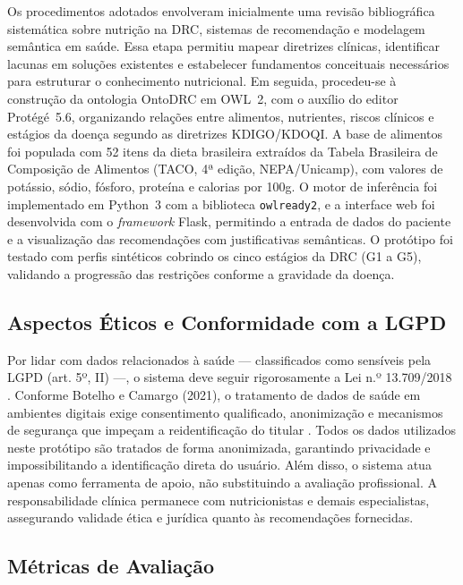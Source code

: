\documentclass[12pt, a4paper, twocolumn]{article}
\begin{document}
Os procedimentos adotados envolveram inicialmente uma revisão bibliográfica sistemática sobre nutrição na DRC, sistemas de recomendação e modelagem semântica em saúde. Essa etapa permitiu mapear diretrizes clínicas, identificar lacunas em soluções existentes e estabelecer fundamentos conceituais necessários para estruturar o conhecimento nutricional. Em seguida, procedeu-se à construção da ontologia OntoDRC em OWL~2, com o auxílio do editor Protégé~5.6, organizando relações entre alimentos, nutrientes, riscos clínicos e estágios da doença segundo as diretrizes KDIGO/KDOQI. A base de alimentos foi populada com 52 itens da dieta brasileira extraídos da Tabela Brasileira de Composição de Alimentos (TACO, 4ª edição, NEPA/Unicamp), com valores de potássio, sódio, fósforo, proteína e calorias por 100g. O motor de inferência foi implementado em Python~3 com a biblioteca \texttt{owlready2}, e a interface web foi desenvolvida com o \textit{framework} Flask, permitindo a entrada de dados do paciente e a visualização das recomendações com justificativas semânticas. O protótipo foi testado com perfis sintéticos cobrindo os cinco estágios da DRC (G1 a G5), validando a progressão das restrições conforme a gravidade da doença.

    \subsection{Aspectos Éticos e Conformidade com a LGPD}

Por lidar com dados relacionados à saúde --- classificados como sensíveis pela LGPD (art. 5º, II) ---, o sistema deve seguir rigorosamente a Lei n.º 13.709/2018 \cite{brasil2018}. Conforme Botelho e Camargo (2021), o tratamento de dados de saúde em ambientes digitais exige consentimento qualificado, anonimização e mecanismos de segurança que impeçam a reidentificação do titular \cite{botelho2021}. Todos os dados utilizados neste protótipo são tratados de forma anonimizada, garantindo privacidade e impossibilitando a identificação direta do usuário. Além disso, o sistema atua apenas como ferramenta de apoio, não substituindo a avaliação profissional. A responsabilidade clínica permanece com nutricionistas e demais especialistas, assegurando validade ética e jurídica quanto às recomendações fornecidas.

    \subsection{Métricas de Avaliação}
\end{document}
